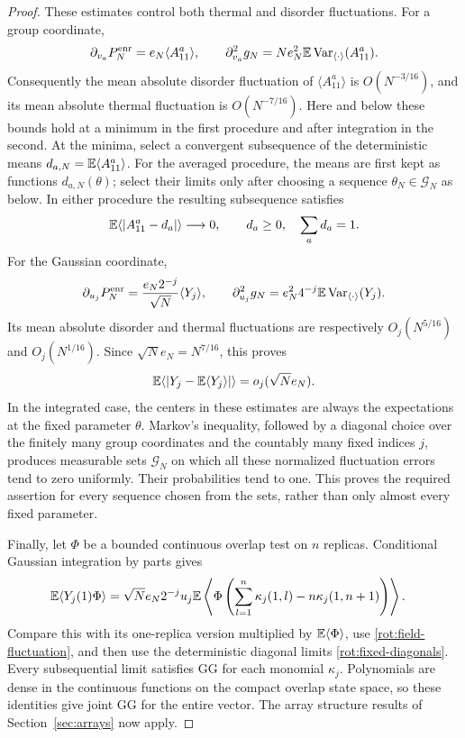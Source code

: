 \begin{proof}
These estimates control both thermal and disorder fluctuations.
For a group coordinate,
\[
 \partial_{v_a}P_N^{\mathrm{enr}}=e_N\langle A^a_{11}\rangle,
 \qquad
 \partial_{v_a}^2g_N
   =Ne_N^2\mathbb E\operatorname{Var}_{\langle\cdot\rangle}(A^a_{11}).
\]
Consequently the mean absolute disorder fluctuation of
\(\langle A^a_{11}\rangle\) is \(O(N^{-3/16})\), and its mean
absolute thermal fluctuation is \(O(N^{-7/16})\).
Here and below these bounds hold at a minimum in the first
procedure and after integration in the second.
At the minima, select a convergent subsequence of the deterministic
means \(d_{a,N}=\mathbb E\langle A^a_{11}\rangle\).
For the averaged procedure, the means are first kept as functions
\(d_{a,N}(\theta)\); select their limits only after choosing a
sequence \(\theta_N\in\mathcal G_N\) as below.
In either procedure the resulting subsequence satisfies
\begin{equation}\label{rot:fixed-diagonals}
 \mathbb E\langle|A^a_{11}-d_a|\rangle\longrightarrow0,
 \qquad d_a\ge0,\quad \sum_a d_a=1.
\end{equation}
For the Gaussian coordinate,
\[
 \partial_{u_j}P_N^{\mathrm{enr}}
     =\frac{e_N2^{-j}}{\sqrt N}\langle Y_j\rangle,
 \qquad
 \partial_{u_j}^2g_N
     =e_N^2 4^{-j}\mathbb E\operatorname{Var}_{\langle\cdot\rangle}(Y_j).
\]
Its mean absolute disorder and thermal fluctuations are respectively
\(O_j(N^{5/16})\) and \(O_j(N^{1/16})\).  Since
\(\sqrt N e_N=N^{7/16}\), this proves
\begin{equation}\label{rot:field-fluctuation}
 \mathbb E\langle|Y_j-\mathbb E\langle Y_j\rangle|\rangle
       =o_j(\sqrt N e_N).
\end{equation}
In the integrated case, the centers in these estimates are always
the expectations at the fixed parameter \(\theta\).
Markov's inequality, followed by a diagonal choice over the finitely
many group coordinates and the countably many fixed indices \(j\),
produces measurable sets \(\mathcal G_N\) on which all these
normalized fluctuation errors tend to zero uniformly.  Their
probabilities tend to one.  This proves the required assertion for
every sequence chosen from the sets, rather than only almost every
fixed parameter.

Finally, let \(\Phi\) be a bounded continuous overlap test on \(n\)
replicas.  Conditional Gaussian integration by parts gives
\begin{align}
 \mathbb E\langle Y_j(1)\Phi\rangle
  ={}&\sqrt N e_N2^{-j}u_j
    \mathbb E\left\langle\Phi
       \left(\sum_{l=1}^n\kappa_j(1,l)
                         -n\kappa_j(1,n+1)\right)\right\rangle .
 \label{rot:gg-ibp}
\end{align}
Compare this with its one-replica version multiplied by
\(\mathbb E\langle\Phi\rangle\), use \eqref{rot:field-fluctuation}, and
then use the deterministic diagonal limits
\eqref{rot:fixed-diagonals}.  Every subsequential limit satisfies
GG for each monomial \(\kappa_j\).
Polynomials are dense in the continuous functions on the compact
overlap state space, so these identities give joint GG for the
entire vector.  The array structure results of
Section~\ref{sec:arrays} now apply.
\end{proof}

